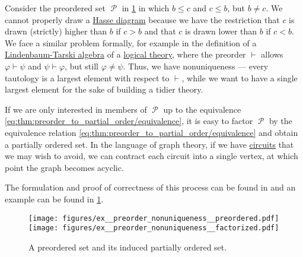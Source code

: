 \begin{example}\label{ex:preorder_nonuniqueness}
  Consider the preordered set \( \mscrP \) in \cref{fig:ex:preorder_nonuniqueness} in which \( b \leq c \) and \( c \leq b \), but \( b \neq c \). We cannot properly draw a \hyperref[def:hasse_diagram]{Hasse diagram} because we have the restriction that \( c \) is drawn (strictly) higher than \( b \) if \( c > b \) and that \( c \) is drawn lower than \( b \) if \( c < b \). We face a similar problem formally, for example in the definition of a \hyperref[def:lindenbaum_tarski_algebra]{Lindenbaum-Tarski algebra} of a \hyperref[def:first_order_theory]{logical theory}, where the preorder \( \vdash \) allows \( \varphi \vdash \psi \) and \( \psi \vdash \varphi \), but still \( \varphi \neq \psi \). Thus, we have nonuniqueness --- every tautology is a largest element with respect to \( \vdash \), while we want to have a single largest element for the sake of building a tidier theory.

  If we are only interested in members of \( \mscrP \) up to the equivalence \eqref{eq:thm:preorder_to_partial_order/equivalence}, it is easy to factor \( \mscrP \) by the equivalence relation \eqref{eq:thm:preorder_to_partial_order/equivalence} and obtain a partially ordered set. In the language of graph theory, if we have \hyperref[def:graph_paths/directed_path]{circuits} that we may wish to avoid, we can contract each circuit into a single vertex, at which point the graph becomes acyclic.

  The formulation and proof of correctness of this process can be found in  and an example can be found in \cref{fig:ex:preorder_nonuniqueness}.

  \begin{figure}
    \hfill
    \texttt{[image: figures/ex\_\_preorder\_nonuniqueness\_\_preordered.pdf]}
    \hfill
    \texttt{[image: figures/ex\_\_preorder\_nonuniqueness\_\_factorized.pdf]}
    \hfill\hfill
    \caption{A preordered set and its induced partially ordered set.}
    \label{fig:ex:preorder_nonuniqueness}
  \end{figure}
\end{example}

